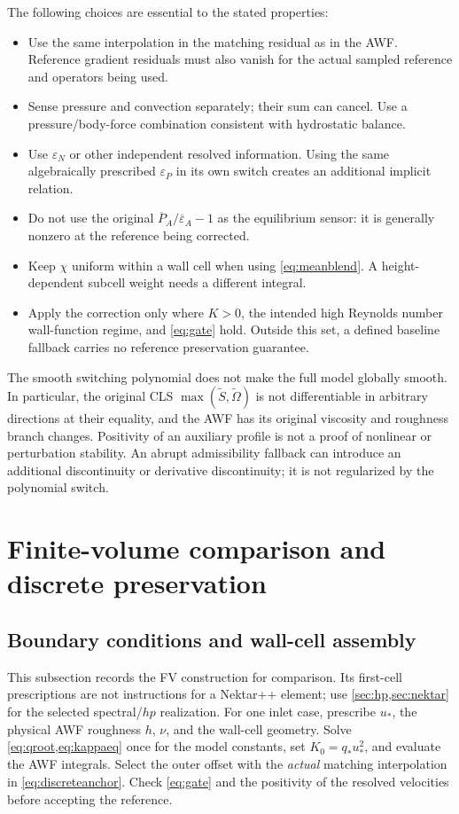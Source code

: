 \documentclass[11pt,a4paper]{article}
\numberwithin{equation}{section}
\newcommand{\eps}{\varepsilon}
\newcommand{\ust}{u_*}
\newcommand{\qs}{q_*}
\newcommand{\avg}[1]{\overline{#1}}
\begin{document}
The following choices are essential to the stated properties:
\begin{itemize}
\item Use the same interpolation in the matching residual as in the AWF.
Reference gradient residuals must also vanish for the actual sampled
reference and operators being used.
\item Sense pressure and convection separately; their sum can cancel.
Use a pressure/body-force combination consistent with hydrostatic balance.
\item Use $\eps_N$ or other independent resolved information. Using the
same algebraically prescribed $\eps_P$ in its own switch creates an
additional implicit relation.
\item Do not use the original $\avg P_A/\avg\eps_A-1$ as the equilibrium
sensor: it is generally nonzero at the reference being corrected.
\item Keep $\chi$ uniform within a wall cell when using
\cref{eq:meanblend}. A height-dependent subcell weight needs a different
integral.
\item Apply the correction only where $K>0$, the intended high Reynolds
number wall-function regime, and \cref{eq:gate} hold.
Outside this set, a defined baseline fallback carries no reference
preservation guarantee.
\end{itemize}
The smooth switching polynomial does not make the full model globally
smooth. In particular, the original CLS
$\max(\widetilde S,\widetilde\Omega)$ is not differentiable in arbitrary
directions at their equality, and the AWF has its original viscosity and
roughness branch changes. Positivity of an auxiliary profile is not a proof
of nonlinear or perturbation stability. An abrupt admissibility fallback
can introduce an additional discontinuity or derivative discontinuity;
it is not regularized by the polynomial switch.
\section{Finite-volume comparison and discrete preservation}
\label{sec:implementation}
\subsection{Boundary conditions and wall-cell assembly}
This subsection records the FV construction for comparison. Its
first-cell prescriptions are not instructions for a Nektar++ element;
use \cref{sec:hp,sec:nektar} for the selected spectral/$hp$ realization.
For one inlet case, prescribe $\ust$, the physical AWF roughness $h$,
$\nu$, and the wall-cell geometry. Solve \cref{eq:qroot,eq:kappaeq}
once for the model constants, set $K_0=\qs\ust^2$, and evaluate the AWF
integrals. Select the outer offset with the \emph{actual} matching
interpolation in \cref{eq:discreteanchor}. Check \cref{eq:gate} and the
positivity of the resolved velocities before accepting the reference.
\end{document}
